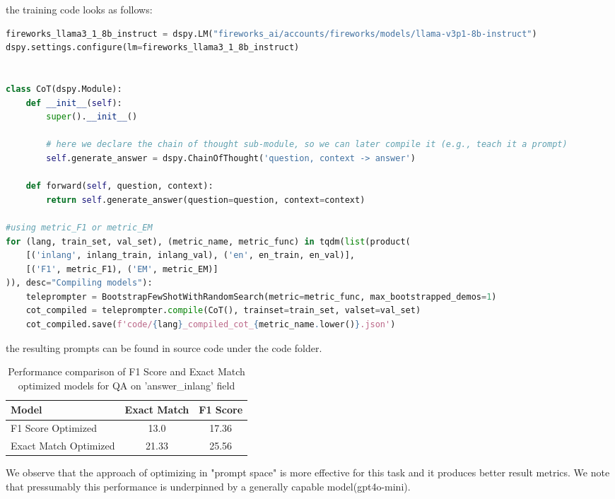 \documentclass[11pt]{article}
\begin{document}
the training code looks as follows:

\begin{lstlisting}[language=Python]
fireworks_llama3_1_8b_instruct = dspy.LM("fireworks_ai/accounts/fireworks/models/llama-v3p1-8b-instruct")
dspy.settings.configure(lm=fireworks_llama3_1_8b_instruct)
    

class CoT(dspy.Module):  
    def __init__(self):
        super().__init__()

        # here we declare the chain of thought sub-module, so we can later compile it (e.g., teach it a prompt)
        self.generate_answer = dspy.ChainOfThought('question, context -> answer')
    
    def forward(self, question, context):
        return self.generate_answer(question=question, context=context)

#using metric_F1 or metric_EM
for (lang, train_set, val_set), (metric_name, metric_func) in tqdm(list(product(
    [('inlang', inlang_train, inlang_val), ('en', en_train, en_val)],
    [('F1', metric_F1), ('EM', metric_EM)]
)), desc="Compiling models"):
    teleprompter = BootstrapFewShotWithRandomSearch(metric=metric_func, max_bootstrapped_demos=1)
    cot_compiled = teleprompter.compile(CoT(), trainset=train_set, valset=val_set)
    cot_compiled.save(f'code/{lang}_compiled_cot_{metric_name.lower()}.json')
\end{lstlisting}

the resulting prompts can be found in source code under the code folder.


\begin{table}[ht]
    \centering
    \begin{tabular}{|l|c|c|}
        \hline
        Model & Exact Match & F1 Score \\
        \hline
        F1 Score Optimized & 13.0 & 17.36 \\
        Exact Match Optimized & 21.33 & 25.56 \\
        \hline
    \end{tabular}
    \caption{Performance comparison of F1 Score and Exact Match optimized models for QA on 'answer\_inlang' field}
    \label{tab:prompt_optimized_week40_performance}
\end{table}

We observe that the approach of optimizing in "prompt space" is more effective for this task and it produces better result metrics.
We note that pressumably this performance is underpinned by a generally capable model(gpt4o-mini). 
\end{document}

